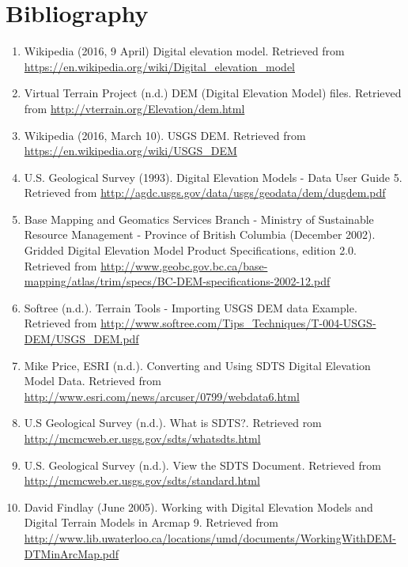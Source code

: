 \documentclass[11pt]{article}
\begin{document}
\section{Bibliography}
\begin{enumerate}[{(1)}]

\item Wikipedia (2016, 9 April) Digital elevation model. Retrieved from \url{https://en.wikipedia.org/wiki/Digital_elevation_model}

\item Virtual Terrain Project (n.d.) DEM (Digital Elevation Model) files. Retrieved from \url{http://vterrain.org/Elevation/dem.html}

\item Wikipedia (2016, March 10). USGS DEM. Retrieved from \url{https://en.wikipedia.org/wiki/USGS_DEM}

\item U.S. Geological Survey (1993). Digital Elevation Models - Data User Guide 5. Retrieved from \url{http://agdc.usgs.gov/data/usgs/geodata/dem/dugdem.pdf}

\item Base Mapping and Geomatics Services Branch - Ministry of Sustainable Resource Management - Province of British Columbia (December 2002). Gridded Digital Elevation Model Product Specifications, edition 2.0. Retrieved from \url{http://www.geobc.gov.bc.ca/base-mapping/atlas/trim/specs/BC-DEM-specifications-2002-12.pdf}

\item Softree (n.d.). Terrain Tools - Importing USGS DEM data Example. Retrieved from \url{http://www.softree.com/Tips_Techniques/T-004-USGS-DEM/USGS_DEM.pdf}

\item Mike Price, ESRI (n.d.). Converting and Using SDTS Digital Elevation Model Data. Retrieved from \url{http://www.esri.com/news/arcuser/0799/webdata6.html}

\item U.S Geological Survey (n.d.). What is SDTS?. Retrieved rom \url{http://mcmcweb.er.usgs.gov/sdts/whatsdts.html}

\item U.S. Geological Survey (n.d.). 
View the SDTS Document. Retrieved from \url{http://mcmcweb.er.usgs.gov/sdts/standard.html}

\item David Findlay (June 2005). Working with Digital Elevation Models and Digital Terrain Models in Arcmap 9. Retrieved from \url{http://www.lib.uwaterloo.ca/locations/umd/documents/WorkingWithDEM-DTMinArcMap.pdf}


\end{enumerate}
\end{document}
